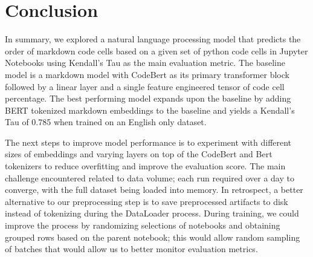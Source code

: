 \documentclass[conference]{IEEEtran}
\begin{document}
\section{Conclusion}
In summary, we explored a  natural language processing model that predicts the order of markdown code cells based on a given set of python code cells in Jupyter Notebooks using Kendall’s Tau as the main evaluation metric. The baseline model is a markdown model with CodeBert as its primary transformer block followed by a linear layer and a single feature engineered tensor of code cell percentage. The best performing model expands upon the baseline by adding BERT tokenized markdown embeddings to the baseline and yields a Kendall’s Tau of 0.785 when trained on an English only dataset.

The next steps to improve model performance is to experiment with different sizes of embeddings and varying layers on top of the CodeBert and Bert tokenizers to reduce overfitting and improve the evaluation score. The main challenge encountered related to data volume; each run required over a day to converge, with the full dataset being loaded into memory. In retrospect, a better alternative to our preprocessing step is to save preprocessed artifacts to disk instead of tokenizing during the DataLoader process. During training, we could improve the process by randomizing selections of notebooks and obtaining grouped rows based on the parent notebook; this would allow random sampling of batches that would allow us to better monitor evaluation metrics.
\end{document}
